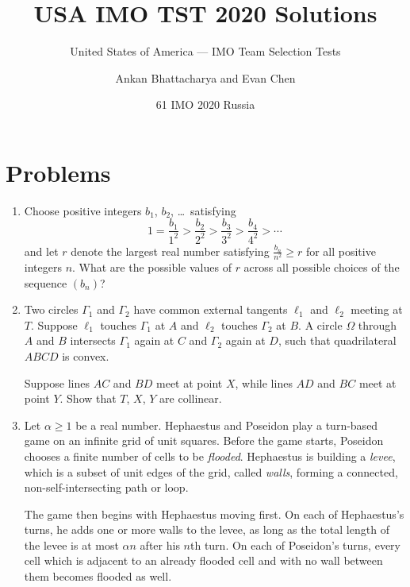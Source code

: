 \documentclass[11pt]{scrartcl}
\begin{document}
\title{USA IMO TST 2020 Solutions}
\subtitle{United States of America --- IMO Team Selection Tests}
\author{Ankan Bhattacharya and Evan Chen}
\date{61 IMO 2020 Russia}

\maketitle

\tableofcontents
\newpage

\addtocounter{section}{-1}
\section{Problems}
\begin{enumerate}[\bfseries 1.]
\item %
Choose positive integers $b_1$, $b_2$, \dots\ satisfying
\[ 1 = \frac{b_1}{1^2} > \frac{b_2}{2^2}
  > \frac{b_3}{3^2} > \frac{b_4}{4^2} > \dotsb \]
and let $r$ denote the largest real number
satisfying $\frac{b_n}{n^2} \ge r$ for all positive integers $n$.
What are the possible values of $r$ across all
possible choices of the sequence $(b_n)$?

\item %
Two circles $\Gamma_1$ and $\Gamma_2$
have common external tangents $\ell_1$ and $\ell_2$ meeting at $T$.
Suppose $\ell_1$ touches $\Gamma_1$ at $A$ and $\ell_2$ touches $\Gamma_2$ at $B$.
A circle $\Omega$ through $A$ and $B$ intersects $\Gamma_1$
again at $C$ and $\Gamma_2$ again at $D$, such that quadrilateral $ABCD$ is convex.

Suppose lines $AC$ and $BD$ meet at point $X$,
while lines $AD$ and $BC$ meet at point $Y$.
Show that $T$, $X$, $Y$ are collinear.

\item %
Let $\alpha \ge 1$ be a real number.
Hephaestus and Poseidon play a turn-based game
on an infinite grid of unit squares.
Before the game starts, Poseidon chooses a finite
number of cells to be \emph{flooded}.
Hephaestus is building a \emph{levee},
which is a subset of unit edges of the grid, called \emph{walls},
forming a connected, non-self-intersecting path or loop.

The game then begins with Hephaestus moving first.
On each of Hephaestus's turns, he adds one or more walls
to the levee, as long as the total length of the levee
is at most $\alpha n$ after his $n$th turn.
On each of Poseidon's turns,
every cell which is adjacent to an already flooded cell
and with no wall between them becomes flooded as well.


\end{enumerate}
\end{document}
